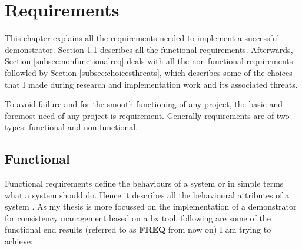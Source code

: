 \section{Requirements}\label{sec:requirements}
This chapter explains all the requirements needed to implement a successful demonstrator. Section \ref{subsec:functionalreq} describes all the functional requirements. Afterwards, Section \ref{subsec:nonfunctionalreq} deals with all the non-functional requirements followled by Section \ref{subsec:choicesthreats}, which describes some of the choices that I made during research and  implementation work and its associated threats. 

To avoid failure and for the smooth functioning of any project, the basic and foremost need of any project is requirement. Generally requirements are of two types: functional and non-functional. 

\subsection{Functional}\label{subsec:functionalreq}
Functional requirements define the behaviours of a system or in simple terms what a system should do. Hence it describes all the behavioural attributes of a system \cite{funcandnonfuncreq}.
\newline\newline As my thesis is more focussed on the implementation of a demonstrator for consistency management based on a bx tool, following are some of the functional end results (referred to as \textbf{FREQ} from now on) I am trying to achieve:

